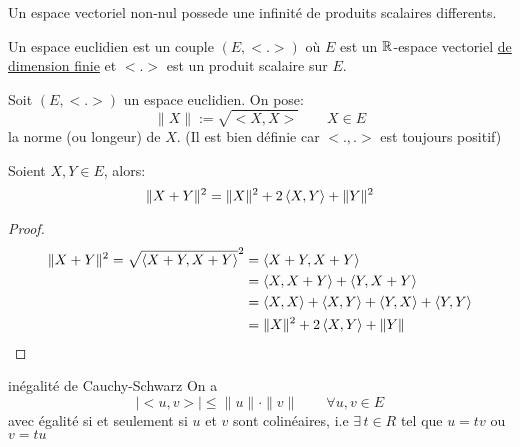 \begin{prop}
    Un espace vectoriel non-nul possede une infinité de produits scalaires differents.   
\end{prop} 

\begin{definition}
    Un espace euclidien est un couple $(E, < . >)$ où $E$ est un  $\mathbb{R}$-espace vectoriel \underline{de dimension finie} et  $< . >$ est un produit scalaire sur  $E$.
\end{definition}
\begin{property} Soit $(E, < . >)$ un espace euclidien. On pose:
    \[
    \|X\| := \sqrt{<X,X>} \qquad X \in E 
    \] 
    la norme (ou longeur) de $X$. (Il est bien définie car $<., .>$ est toujours positif)
\end{property}
\begin{property}
   Soient $X, Y \in E$, alors:
   \[
       \|X + Y\|^2 = \|X\|^2 + 2\left\langle X, Y \right\rangle + \|Y\|^2
   \] 
\end{property}
\begin{proof}
   \begin{align*}
       \|X + Y\|^2 = \sqrt{\left\langle X + Y, X + Y \right\rangle}^2 &= \left\langle X + Y, X + Y \right\rangle \\ 
                                                     &= \left\langle X, X + Y \right\rangle + \left\langle Y, X + Y \right\rangle  \\
                                                     &= \left\langle X, X \right\rangle + \left\langle X, Y \right\rangle + \left\langle Y, X \right\rangle + \left\langle Y, Y \right\rangle\\
                                                     &= \|X\|^2 + 2\left\langle X, Y \right\rangle + \|Y\|
   \end{align*} 
\end{proof}
\begin{lemma}\label{lemma:inegalite-cauchy-schwarz} inégalité de Cauchy-Schwarz
   On a
   \[
   |<u, v>| \le \|u\| \cdot \|v\| \qquad \forall u, v \in E
   \] 
   avec égalité si et seulement si $u$ et  $v$ sont colinéaires, i.e  $\exists \, t \in R$ tel que $u = tv$ ou  $v = tu$
\end{lemma}
